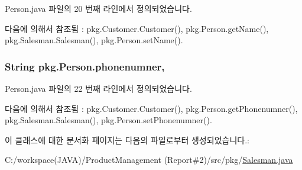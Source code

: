 Person.\+java 파일의 20 번째 라인에서 정의되었습니다.



다음에 의해서 참조됨 \+:  pkg.\+Customer.\+Customer(), pkg.\+Person.\+get\+Name(), pkg.\+Salesman.\+Salesman(), pkg.\+Person.\+set\+Name().

\subsubsection[{\texorpdfstring{phonenumner}{phonenumner}}]{\setlength{\rightskip}{0pt plus 5cm}String pkg.\+Person.\+phonenumner\hspace{0.3cm}{\ttfamily [protected]}, {\ttfamily [inherited]}}\hypertarget{classpkg_1_1_person_aa7a67349f91a08a8cc45067354653c1d}{}\label{classpkg_1_1_person_aa7a67349f91a08a8cc45067354653c1d}


Person.\+java 파일의 22 번째 라인에서 정의되었습니다.



다음에 의해서 참조됨 \+:  pkg.\+Customer.\+Customer(), pkg.\+Person.\+get\+Phonenumner(), pkg.\+Salesman.\+Salesman(), pkg.\+Person.\+set\+Phonenumner().



이 클래스에 대한 문서화 페이지는 다음의 파일로부터 생성되었습니다.\+:\begin{DoxyCompactItemize}
\item 
C\+:/workspace(\+J\+A\+V\+A)/\+Product\+Management (\+Report\#2)/src/pkg/\hyperlink{_salesman_8java}{Salesman.\+java}\end{DoxyCompactItemize}

